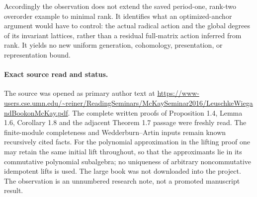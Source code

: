 Accordingly the observation does not extend the saved period-one,
rank-two overorder example to minimal rank.  It identifies what an
optimized-anchor argument would have to control: the actual radical
action and the global degrees of its invariant lattices, rather than
a residual full-matrix action inferred from rank.  It yields no new
uniform generation, cohomology, presentation, or representation bound.

\paragraph{Exact source read and status.}
The source was opened as primary author text at
\url{https://www-users.cse.umn.edu/~reiner/ReadingSeminars/McKaySeminar2016/LeuschkeWiegandBookonMcKay.pdf}.
The complete written proofs of Proposition 1.4, Lemma 1.6,
Corollary 1.8 and the adjacent Theorem 1.7 passage were freshly read.
The finite-module completeness and Wedderburn--Artin inputs remain
known recursively cited facts.  For the polynomial approximation in
the lifting proof one may retain the same initial lift throughout,
so that the approximants lie in its commutative polynomial subalgebra;
no uniqueness of arbitrary noncommutative idempotent lifts is used.
The large book was not downloaded into the project.  The observation
is an unnumbered research note, not a promoted manuscript result.
